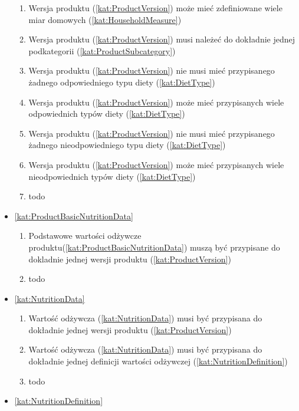 \begin{itemize}[label={\textbf{Reguły dla}}, wide, labelwidth=!, labelindent=0pt]
\begin{enumerate}[label={\textbf{REG/\protect\threedigits{\arabic{enumi}}}}, wide, labelwidth=!, align=left, leftmargin=3cm, resume]
        \item Wersja produktu (\ref{kat:ProductVersion}) może mieć zdefiniowane wiele miar domowych (\ref{kat:HouseholdMeasure})
        \item Wersja produktu (\ref{kat:ProductVersion}) musi należeć do dokładnie jednej podkategorii (\ref{kat:ProductSubcategory})
        \item Wersja produktu (\ref{kat:ProductVersion}) nie musi mieć przypisanego żadnego odpowiedniego typu diety (\ref{kat:DietType})
        \item Wersja produktu (\ref{kat:ProductVersion}) może mieć przypisanych wiele odpowiednich typów diety (\ref{kat:DietType})
        \item Wersja produktu (\ref{kat:ProductVersion}) nie musi mieć przypisanego żadnego nieodpowiedniego typu diety (\ref{kat:DietType})
        \item Wersja produktu (\ref{kat:ProductVersion}) może mieć przypisanych wiele nieodpowiednich typów diety (\ref{kat:DietType})
        \item todo
    \end{enumerate}
    \item\ref{kat:ProductBasicNutritionData}
    \begin{enumerate}[label={\textbf{REG/\protect\threedigits{\arabic{enumi}}}}, wide, labelwidth=!, align=left, leftmargin=3cm, resume]
        \item Podstawowe wartości odżywcze produktu(\ref{kat:ProductBasicNutritionData}) muszą być przypisane do dokladnie jednej wersji produktu (\ref{kat:ProductVersion})
        \item todo
    \end{enumerate}
    \item\ref{kat:NutritionData}
    \begin{enumerate}[label={\textbf{REG/\protect\threedigits{\arabic{enumi}}}}, wide, labelwidth=!, align=left, leftmargin=3cm, resume]
        \item Wartość odżywcza (\ref{kat:NutritionData}) musi być przypisana do dokładnie jednej wersji produktu (\ref{kat:ProductVersion})
        \item Wartość odżywcza (\ref{kat:NutritionData}) musi być przypisana do dokładnie jednej definicji wartości odżywczej (\ref{kat:NutritionDefinition})
        \item todo
    \end{enumerate}
    \item\ref{kat:NutritionDefinition}

\end{itemize}
